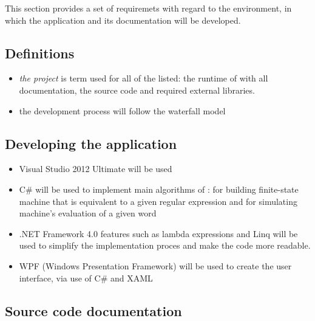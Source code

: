 \documentclass{article}
\begin{document}
This section provides a set of requiremets with regard to the environment, in which the application
and its documentation will be developed.

\subsection*{Definitions}

\begin{itemize}

  \item \textit{the project} is term used for all of the listed: the runtime of \titletext{} with
  all documentation, the source code and required external libraries.

  \item the development process will follow the waterfall model

\end{itemize}

\subsection{Developing the application}

\begin{itemize}

  \item Visual Studio 2012 Ultimate will be used

  \item C\# will be used to implement main algorithms of \titletext: for building finite-state
  machine that is equivalent to a given regular expression and for simulating machine's evaluation
  of a given word

  \item .NET Framework 4.0 features such as lambda expressions and Linq will be used to simplify the
  implementation proces and make the code more readable.

  \item WPF (Windows Presentation Framework) will be used to create the user interface, via use of
  C\# and XAML

\end{itemize}

\subsection{Source code documentation}
\end{document}
